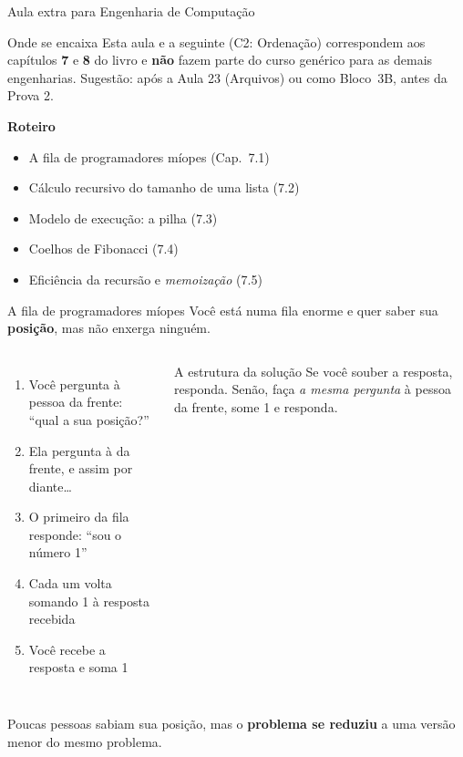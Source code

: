 \documentclass[aspectratio=169,10pt,t]{beamer}
\begin{document}
\capa

\begin{frame}{Aula extra para Engenharia de Computação}
  \begin{alertblock}{Onde se encaixa}
    Esta aula e a seguinte (C2: Ordenação) correspondem aos capítulos \textbf{7} e \textbf{8} do livro e \textbf{não} fazem parte do curso genérico para as demais engenharias. Sugestão: após a Aula 23 (Arquivos) ou como Bloco~3B, antes da Prova 2.
  \end{alertblock}
  \textbf{Roteiro}
  \begin{itemize}
    \item A fila de programadores míopes (Cap.~7.1)
    \item Cálculo recursivo do tamanho de uma lista (7.2)
    \item Modelo de execução: a pilha (7.3)
    \item Coelhos de Fibonacci (7.4)
    \item Eficiência da recursão e \emph{memoização} (7.5)
  \end{itemize}
\end{frame}

\begin{frame}{A fila de programadores míopes}
  Você está numa fila enorme e quer saber sua \textbf{posição}, mas não enxerga ninguém.
  \begin{columns}[T]
    \begin{enumerate}
      \item Você pergunta à pessoa da frente: ``qual a sua posição?''
      \item Ela pergunta à da frente, e assim por diante\ldots
      \item O \alert{primeiro} da fila responde: ``sou o número 1''
      \item Cada um volta somando 1 à resposta recebida
      \item Você recebe a resposta e soma 1
    \end{enumerate}
    \begin{block}{A estrutura da solução}
      Se você souber a resposta, responda. Senão, faça \emph{a mesma pergunta} à pessoa da frente, some 1 e responda.
    \end{block}
  \end{columns}
  \vspace{1ex}
  Poucas pessoas sabiam sua posição, mas o \textbf{problema se reduziu} a uma versão menor do mesmo problema.
\end{frame}
\end{document}
